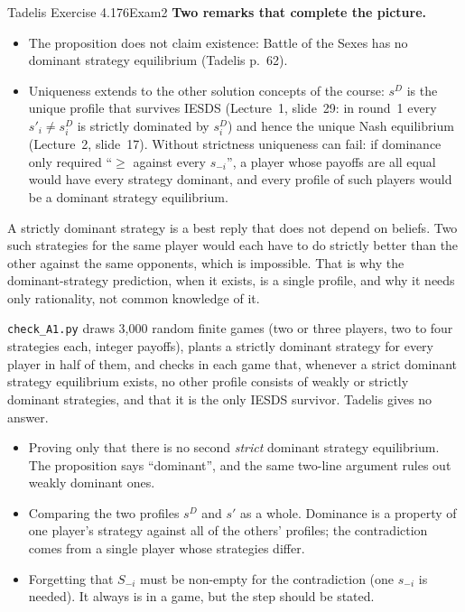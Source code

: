 \begin{exsol}{Tadelis Exercise 4.1}{76}{Exam}{2}
\textbf{Two remarks that complete the picture.}
\begin{itemize}
  \item The proposition does not claim existence: Battle of the Sexes has no dominant strategy
  equilibrium (Tadelis p.~62).
  \item Uniqueness extends to the other solution concepts of the course: $s^D$ is the unique
  profile that survives IESDS (Lecture~1, slide~29: in round~1 every $s'_i \ne s_i^D$ is strictly
  dominated by $s_i^D$) and hence the unique Nash equilibrium (Lecture~2, slide~17). Without
  strictness uniqueness can fail: if dominance only required ``$\ge$ against every $s_{-i}$'', a
  player whose payoffs are all equal would have every strategy dominant, and every profile of such
  players would be a dominant strategy equilibrium.
\end{itemize}

\interp A strictly dominant strategy is a best reply that does not depend on beliefs. Two such
strategies for the same player would each have to do strictly better than the other against the
same opponents, which is impossible. That is why the dominant-strategy prediction, when it exists,
is a single profile, and why it needs only rationality, not common knowledge of it.

\verify \texttt{check\_A1.py} draws 3{,}000 random finite games (two or three players, two to four
strategies each, integer payoffs), plants a strictly dominant strategy for every player in half of
them, and checks in each game that, whenever a strict dominant strategy equilibrium exists, no
other profile consists of weakly or strictly dominant strategies, and that it is the only IESDS
survivor. Tadelis gives no answer.

\mistakes
\begin{itemize}
  \item Proving only that there is no second \emph{strict} dominant strategy equilibrium. The
  proposition says ``dominant'', and the same two-line argument rules out weakly dominant ones.
  \item Comparing the two profiles $s^D$ and $s'$ as a whole. Dominance is a property of one
  player's strategy against all of the others' profiles; the contradiction comes from a single
  player whose strategies differ.
  \item Forgetting that $S_{-i}$ must be non-empty for the contradiction (one $\hat s_{-i}$ is
  needed). It always is in a game, but the step should be stated.
\end{itemize}

\end{exsol}
